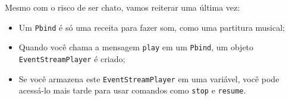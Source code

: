 Mesmo com o risco de ser chato, vamos reiterar uma última vez:
\begin{itemize}
\item Um \texttt{Pbind} é só uma receita para fazer som, como uma partitura musical;
\item Quando você chama a mensagem \texttt{play} em um \texttt{Pbind}, um objeto \texttt{EventStreamPlayer} é criado;
\item Se você armazena este \texttt{EventStreamPlayer} em uma variável, você pode acessá-lo mais tarde para usar comandos como \texttt{stop} e \texttt{resume}.
\end{itemize} 
